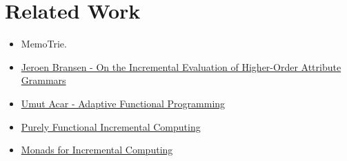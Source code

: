 \section{Related Work}

\begin{itemize}
  \item MemoTrie.\cite{hinze2000memo}
  \item \href{http://jeroen.bransen.nl/phdthesis.pdf}{Jeroen Bransen - On the Incremental Evaluation of Higher-Order Attribute Grammars}
  \item \href{https://dl.acm.org/doi/pdf/10.1145/1186632.1186634}{Umut Acar - Adaptive Functional Programming}
  \item \href{http://firsov.ee/incremental/incremental.pdf}{Purely Functional Incremental Computing}
  \item \href{https://dl.acm.org/doi/pdf/10.1145/581478.581482?casa_token=RBzeRZRH7MQAAAAA:LBZY0xz8T3hSkAdb8HXA-i42tQLkTmn2FpILTpjHq2v7AubOSoJCzcm7XorRDwvtCvKXwF8dq5VJWA}{Monads for Incremental Computing}
\end{itemize} 